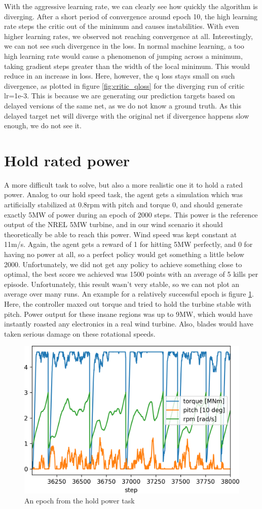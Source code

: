 \documentclass[hyperref,beleg]{cgvpub}
\begin{document}
With the aggressive learning rate, we can clearly see how quickly the algorithm is diverging. After a short period of convergence around epoch 10, the high learning rate steps the critic out of the minimum and causes instabilities. With even higher learning rates, we observed not reaching convergence at all. Interestingly, we can not see such divergence in the loss. In normal machine learning, a too high learning rate would cause a phenomenon of jumping across a minimum, taking gradient steps greater than the width of the local minimum. This would reduce in an increase in loss. Here, however, the q loss stays small on such divergence, as plotted in figure \ref{fig:critic_qloss} for the diverging run of critic lr=1e-3. This is because we are generating our prediction targets based on delayed versions of the same net, as we do not know a ground truth. As this delayed target net will diverge with the original net if divergence happens slow enough, we do not see it. 



\section{Hold rated power}
A more difficult task to solve, but also a more realistic one it to hold a rated power. Analog to our hold speed task, the agent gets a simulation which was artificially stabilized at 0.8rpm with pitch and torque 0, and should generate exactly 5MW of power during an epoch of 2000 steps. This power is the reference output of the NREL 5MW turbine, and in our wind scenario it should theoretically be able to reach this power. Wind speed was kept constant at 11m/s. Again, the agent gets a reward of 1 for hitting 5MW perfectly, and 0 for having no power at all, so a perfect policy would get something a little below 2000. Unfortunately, we did not get any policy to achieve something close to optimal, the best score we achieved was 1500 points with an average of 5 kills per episode. Unfortunately, this result wasn't very stable, so we can not plot an average over many runs. An example for a relatively successful epoch is figure \ref{fig:crashing_turbines}. Here, the controller maxed out torque and tried to hold the turbine stable with pitch. Power output for these insane regions was up to 9MW, which would have instantly roasted any electronics in a real wind turbine. Also, blades would have taken serious damage on these rotational speeds.

\begin{figure}
  \centering
  \includegraphics[width=0.5\linewidth]{images/crashing_turbines.png}
  \caption{An epoch from the hold power task}
  \label{fig:crashing_turbines}
\end{figure}
\end{document}
